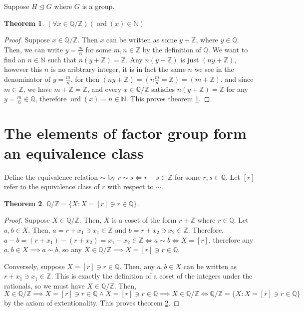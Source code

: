\documentclass[12pt]{article}
\newcommand{\nats}{\mathbb{N}}
\newcommand{\rats}{\mathbb{Q}}
\newcommand{\ints}{\mathbb{Z}}
\newcommand{\ord}{\operatorname{ord}}
\newtheorem{thm}{Theorem}
\begin{document}
Suppose $H \trianglelefteq G$ where $G$ is a group.

\begin{thm} \label{thm5}
	$(\forall x \in \rats / \ints)(\ord(x) \in \nats)$
\end{thm}

\begin{proof}
	Suppose $x \in \rats / \ints$.
	Then $x$ can be written as
	some $y + \ints$,
	where $y \in \rats$.
	Then, we can write $y = \frac{m}{n}$
	for some $m,n \in \ints$
	by the definition of $\rats$.
	We want to find an $n \in \nats$
	such that $n(y + \ints) = \ints$.
	Any $n(y + \ints)$ is just $(ny + \ints)$,
	however this $n$ is no aribtrary integer,
	it is in fact the same $n$ we see in
	the denominator of $y = \frac{m}{n}$,
	for then $(ny + \ints) = (n\frac{m}{n} = \ints) = (m + \ints)$,
	and since $m \in \ints$, we have $m + \ints = \ints$,
	and every $x \in \rats / \ints$ satisfies $n(y + \ints) = \ints$
	for any $y = \frac{m}{n} \in \rats$,
	therefore $\ord(x) = n \in \nats$.
	This proves theorem \ref{thm5}.
\end{proof}


\section{The elements of factor group form an equivalence class}

Define the equivalence relation $\sim$
by $r \sim s \iff r - s \in \ints$ for some $r,s \in \rats$.
Let $[r]$ refer to the equivalence class of $r$ with respect to $\sim$.

\begin{thm} \label{thm6}
	$\rats / \ints = \{X: X = [r] \ni r \in \rats \}$.
\end{thm}

\begin{proof}
	Suppose $X \in \rats / \ints$.
	Then, $X$ is a coset of the form $r + \ints$
	where $r \in \rats$.
	Let $a,b \in X$.
	Then, $a = r + x_1 \ni x_1 \in \ints$
	and $b = r + x_2 \ni x_2 \in \ints$.
	Therefore, $a -b = (r + x_1) - (r + x_2) = x_1 - x_2 \in \ints \iff a \sim b \iff X = [r]$,
	therefore any $a,b \in X \implies a \sim b$,
	so any $X \in \rats / \ints \implies X = [r] \ni r \in \rats$.

	Conversely, suppose $X = [r] \ni r \in \rats$.
	Then, any $a,b \in X$ can be written as
	$r + x_1 \ni x_1 \in \ints$.
	This is exactly the definition of a coset of the integers under the rationals,
	so we must have $X \in \rats / \ints$.
	Then, $X \in \rats / \ints \implies X = [r] \ni r \in \rats \land
	X = [r] \ni r \in \rats \implies X \in \rats / \ints \iff
	\rats / \ints = \{ X: X = [r] \ni r \in \rats \}$
	by the axiom of extentionality.
	This proves theorem \ref{thm6}.
\end{proof}
\end{document}
